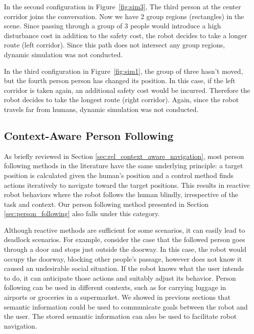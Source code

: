 \documentclass{tADR2e}
\begin{document}
In the second configuration in Figure~\ref{fig:sim3}, The third person at the center corridor joins the conversation. Now we have 2 group regions (rectangles) in the scene. Since passing through a group of 3 people would introduce a high disturbance cost in addition to the safety cost, the robot decides to take a longer route (left corridor). Since this path does not intersect any group regions, dynamic simulation was not conducted.

In the third configuration in Figure~\ref{fig:sim1}, the group of three hasn't moved, but the fourth person person has changed its position. In this case, if the left corridor is taken again, an additional safety cost would be incurred. Therefore the robot decides to take the longest route (right corridor). Again, since the robot travels far from humans, dynamic simulation was not conducted.

\subsection{Context-Aware Person Following}
\label{sec:context_aware_person_following}

As briefly reviewed in Section \ref{sec:rel_context_aware_navigation}, most person following methods in the literature have the same underlying principle: a target position is calculated given the human's position and a control method finds actions iteratively to navigate toward the target positions. This results in reactive robot behaviors where the robot follows the human blindly, irrespective of the task and context. Our person following method presented in Section \ref{sec:person_following} also falls under this category.

Although reactive methods are sufficient for some scenarios, it can easily lead to deadlock scenarios. For example, consider the case that the followed person goes through a door and stops just outside the doorway. In this case, the robot would occupy the doorway, blocking other people's passage, however does not know it caused an undesirable social situation. If the robot knows what the user intends to do, it can anticipate those actions and suitably adjust its behavior. Person following can be used in different contexts, such as for carrying luggage in airports or groceries in a supermarket. We showed in previous sections that semantic information could be used to communicate goals between the robot and the user. The stored semantic information can also be used to facilitate robot navigation.
\end{document}
